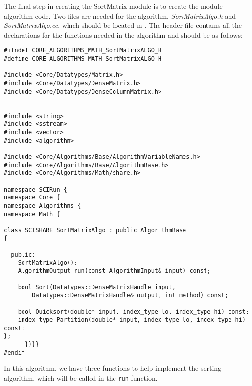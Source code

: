 \documentclass[fleqn,11pt,openany]{book}
\begin{document}
The final step in creating the SortMatrix module is to create the module algorithm code.  
Two files are needed for the algorithm, \emph{SortMatrixAlgo.h} and \emph{SortMatrixAlgo.cc}, which should be located in \emph{}. 
The header file contains all the declarations for the functions needed in the algorithm and should be as follows:
\begin{verbatim}
#ifndef CORE_ALGORITHMS_MATH_SortMatrixALGO_H
#define CORE_ALGORITHMS_MATH_SortMatrixALGO_H

#include <Core/Datatypes/Matrix.h>
#include <Core/Datatypes/DenseMatrix.h>
#include <Core/Datatypes/DenseColumnMatrix.h>


#include <string>
#include <sstream>
#include <vector>
#include <algorithm>

#include <Core/Algorithms/Base/AlgorithmVariableNames.h>
#include <Core/Algorithms/Base/AlgorithmBase.h>
#include <Core/Algorithms/Math/share.h>

namespace SCIRun {
namespace Core {
namespace Algorithms {
namespace Math {

class SCISHARE SortMatrixAlgo : public AlgorithmBase
{

  public:
    SortMatrixAlgo();
    AlgorithmOutput run(const AlgorithmInput& input) const;
  
    bool Sort(Datatypes::DenseMatrixHandle input, 
        Datatypes::DenseMatrixHandle& output, int method) const;
  
    bool Quicksort(double* input, index_type lo, index_type hi) const;
    index_type Partition(double* input, index_type lo, index_type hi) const;
};
      }}}}
#endif
\end{verbatim}
In this algorithm, we have three functions to help implement the sorting algorithm, which will be called in the \verb|run| function.  
\end{document}
